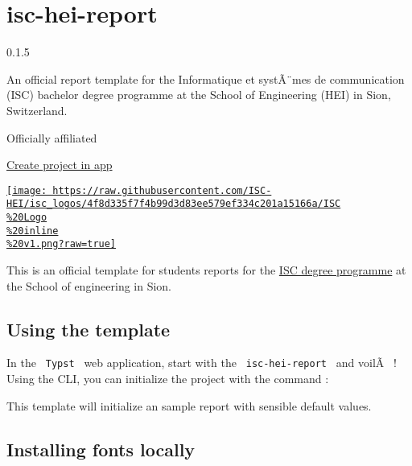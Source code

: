 \section{isc-hei-report}\label{isc-hei-report}

{ 0.1.5 }

An official report template for the \textquotesingle Informatique et
systÃ¨mes de communication\textquotesingle{} (ISC) bachelor degree
programme at the School of Engineering (HEI) in Sion, Switzerland.

{ } Officially affiliated

\href{/app?template=isc-hei-report&version=0.1.5}{Create project in app}

\label{readme}

\href{https://hevs.ch/isc}{\texttt{[image: https://raw.githubusercontent.com/ISC-HEI/isc\_logos/4f8d335f7f4b99d3d83ee579ef334c201a15166a/ISC\\\%20Logo\\\%20inline\\\%20v1.png?raw=true]}}

This is an official template for students reports for the
\href{https://isc.hevs.ch/}{ISC degree programme} at the School of
engineering in Sion.

\subsection{Using the template}\label{using-the-template}

In the \texttt{\ Typst\ } web application, start with the
\texttt{\ isc-hei-report\ } and voilÃ~ ! Using the CLI, you can
initialize the project with the command :

\begin{Shaded}
\begin{Highlighting}[]
\end{Highlighting}
\end{Shaded}

This template will initialize an sample report with sensible default
values.

\subsection{Installing fonts locally}\label{installing-fonts-locally}

